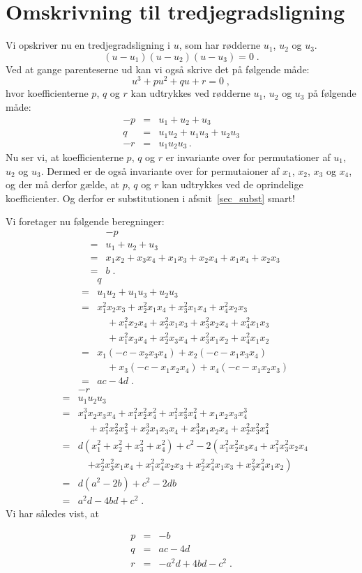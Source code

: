 \documentclass[12pt,oneside,a4paper]{article}
\newcommand{\bas}{\begin{eqnarray*}}
\newcommand{\eas}{\end{eqnarray*}}
\newcommand{\bea}{\begin{eqnarray}}
\newcommand{\eea}{\end{eqnarray}}
\begin{document}
\section{Omskrivning til tredjegradsligning} \label{sec_omskriv}
Vi opskriver nu en tredjegradsligning i $u$, som har rødderne $u_1$, $u_2$ og 
$u_3$.
\begin{equation}
    (u-u_1)(u-u_2)(u-u_3)=0 \;.
    \label{tredje_1}
\end{equation}
Ved at gange parenteserne ud kan vi også skrive det på følgende måde:
\begin{equation}
    u^3 + pu^2+ qu + r = 0 \;,
    \label{tredje_2}
\end{equation}
hvor koefficienterne $p$, $q$ og $r$ kan udtrykkes ved rødderne $u_1$, $u_2$ og $u_3$ på følgende måde:
\bea
-p &=& u_1 + u_2 + u_3 \label{equ_p}\\
 q &=& u_1u_2 + u_1u_3 + u_2u_3 \label{equ_q}\\
-r &=& u_1u_2u_3 \label{equ_r}\,.
\eea
Nu ser vi, at koefficienterne $p$, $q$ og $r$ er invariante over for
permutationer af $u_1$, $u_2$ og $u_3$. Dermed er de også invariante over for
permutaioner af $x_1$, $x_2$, $x_3$ og $x_4$, og der må derfor gælde, at $p$,
$q$ og $r$ kan udtrykkes ved de oprindelige koefficienter. Og derfor er
substitutionen i afsnit~\ref{sec_subst} smart!

Vi foretager nu følgende beregninger:
\bas
&& -p \\
&=& u_1+u_2+u_3 \\
&=& x_1x_2+x_3x_4 + x_1x_3+x_2x_4 + x_1x_4+x_2x_3 \\
&=& b\;.
\eas
\bas
&& q \\
&=& u_1u_2 + u_1u_3 + u_2u_3 \\
&=& x_1^2x_2x_3 + x_2^2x_1x_4 + x_3^2x_1x_4 + x_4^2x_2x_3 \\
&& \quad +x_1^2x_2x_4 + x_2^2x_1x_3 + x_3^2x_2x_4 + x_4^2x_1x_3 \\
&& \quad +x_1^2x_3x_4 + x_2^2x_3x_4 + x_3^2x_1x_2 + x_4^2x_1x_2 \\
&=& x_1(-c-x_2x_3x_4) + x_2(-c-x_1x_3x_4) \\
&& \quad + x_3(-c-x_1x_2x_4) + x_4(-c-x_1x_2x_3) \\
&=& ac-4d \;.
\eas
\bas
&& -r \\
&=& u_1u_2u_3 \\
&=& x_1^3x_2x_3x_4 + x_1^2x_2^2x_4^2 + x_1^2x_3^2x_4^2 + x_1x_2x_3x_4^3 \\
&& \quad + x_1^2x_2^2x_3^2 + x_2^3x_1x_3x_4 + x_3^3x_1x_2x_4 + x_2^2x_3^2x_4^2 \\
&=& d(x_1^2+x_2^2+x_3^2+x_4^2) + c^2 - 2\left(x_1^2x_2^2x_3x_4 + x_1^2x_3^2x_2x_4 \right.\\
&& \quad \left. + x_2^2x_3^2x_1x_4 + x_1^2x_4^2x_2x_3 + x_2^2x_4^2x_1x_3 + x_3^2x_4^2x_1x_2\right) \\
&=& d(a^2-2b) + c^2 - 2db \\
&=& a^2d - 4bd + c^2 \;.
\eas
Vi har således vist, at
\begin{tcolorbox}
\bea
p &=& -b \label{eq_p}\\
q &=& ac-4d \label{eq_q}\\
r &=& -a^2d+4bd-c^2 \label{eq_r}\;.
\eea
\end{tcolorbox}
\end{document}
